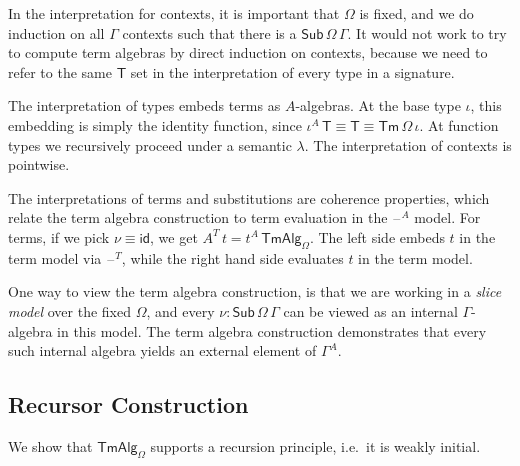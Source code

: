\documentclass[12pt,a4paper,twoside,openany]{book}
\theoremstyle{remark}
\theoremstyle{definition}
\theoremstyle{theorem}
\newcommand{\ms}[1]{\mathsf{#1}}
\newcommand{\id}{\mathsf{id}}
\newcommand{\Sub}{\mathsf{Sub}}
\newcommand{\Tm}{\mathsf{Tm}}
\newcommand{\blank}{\mathord{\hspace{1pt}\text{--}\hspace{1pt}}}
\newcommand{\TmAlg}{\ms{TmAlg}}
\begin{document}
In the interpretation for contexts, it is important that $\Omega$ is
fixed, and we do induction on all $\Gamma$ contexts such that there is a
$\Sub\,\Omega\,\Gamma$. It would not work to try to compute term algebras by
direct induction on contexts, because we need to refer to the same $\ms{T}$ set
in the interpretation of every type in a signature.

The interpretation of types embeds terms as $A$-algebras. At the base type
$\iota$, this embedding is simply the identity function, since $\iota^A\,\ms{T}
\equiv \ms{T} \equiv \Tm\,\Omega\,\iota$. At function types we recursively proceed
under a semantic $\lambda$. The interpretation of contexts is pointwise.

The interpretations of terms and substitutions are coherence properties, which
relate the term algebra construction to term evaluation in the $\blank^A$ model.
For terms, if we pick $\nu \equiv \id$, we get $A^T\,t =
t^A\,\TmAlg_{\Omega}$. The left side embeds $t$ in the term model via
$\blank^T$, while the right hand side evaluates $t$ in the term model.

One way to view the term algebra construction, is that we are working in a
\emph{slice model} over the fixed $\Omega$, and every $\nu :
\Sub\,\Omega\,\Gamma$ can be viewed as an internal $\Gamma$-algebra in this
model. The term algebra construction demonstrates that every such internal
algebra yields an external element of $\Gamma^A$.


\subsection{Recursor Construction}
\label{sec:simple-weak-initiality}
We show that $\TmAlg_{\Omega}$ supports a recursion principle, i.e.\ it is weakly
initial.
\end{document}
